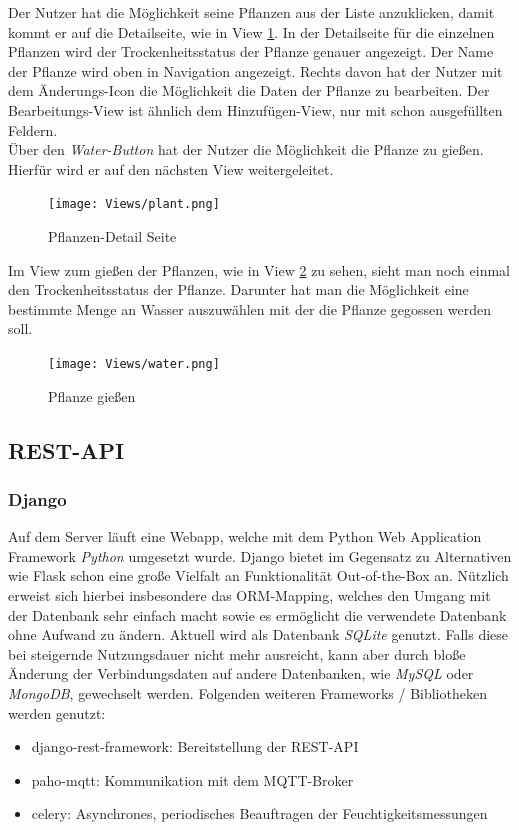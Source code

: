 Der Nutzer hat die Möglichkeit seine Pflanzen aus der Liste anzuklicken, damit kommt er auf die Detailseite, wie in View \ref{plant}. In der Detailseite für die einzelnen Pflanzen wird der Trockenheitsstatus der Pflanze genauer angezeigt. Der Name der Pflanze wird oben in Navigation angezeigt. Rechts davon hat der Nutzer mit dem Änderungs-Icon die Möglichkeit die Daten der Pflanze zu bearbeiten. Der Bearbeitungs-View ist ähnlich dem Hinzufügen-View, nur mit schon ausgefüllten Feldern. \\

Über den \textit{Water-Button} hat der Nutzer die Möglichkeit die Pflanze zu gießen. Hierfür wird er auf den nächsten View weitergeleitet. 

\begin{figure}[H]
    \centering
    \texttt{[image: Views/plant.png]}
    \caption{Pflanzen-Detail Seite}
    \label{plant}
\end{figure}

Im View zum gießen der Pflanzen, wie in View \ref{water} zu sehen, sieht man noch einmal den Trockenheitsstatus der Pflanze. Darunter hat man die Möglichkeit eine bestimmte Menge an Wasser auszuwählen mit der die Pflanze gegossen werden soll. 
\begin{figure}[H]
    \centering
    \texttt{[image: Views/water.png]}
    \caption{Pflanze gießen}
    \label{water}
\end{figure}

    \subsection{REST-API}

        \subsubsection{Django}
        Auf dem Server läuft eine Webapp, welche mit dem Python Web Application Framework \textit{Python} umgesetzt wurde. Django bietet im Gegensatz zu Alternativen wie Flask schon eine große Vielfalt an Funktionalität Out-of-the-Box an. Nützlich erweist sich hierbei insbesondere das ORM-Mapping, welches den Umgang mit der Datenbank sehr einfach macht sowie es ermöglicht die verwendete Datenbank ohne Aufwand zu ändern. Aktuell wird als Datenbank \textit{SQLite} genutzt. Falls diese bei steigernde Nutzungsdauer nicht mehr ausreicht, kann aber durch bloße Änderung der Verbindungsdaten auf andere Datenbanken, wie \textit{MySQL} oder \textit{MongoDB}, gewechselt werden.
        Folgenden weiteren Frameworks / Bibliotheken werden genutzt:
        \begin{itemize}
            \item django-rest-framework: Bereitstellung der REST-API
            \item paho-mqtt: Kommunikation mit dem MQTT-Broker
            \item celery: Asynchrones, periodisches Beauftragen der Feuchtigkeitsmessungen
        \end{itemize}
    

